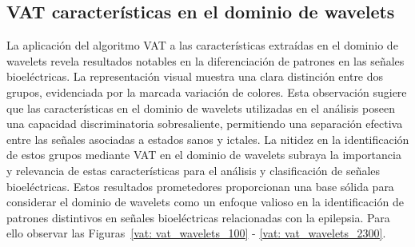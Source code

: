 \subsection{VAT características en el dominio de wavelets}
La aplicación del algoritmo VAT a las características extraídas en el dominio de wavelets revela resultados notables en la diferenciación de patrones en las señales bioeléctricas. La representación visual muestra una clara distinción entre dos grupos, evidenciada por la marcada variación de colores. Esta observación sugiere que las características en el dominio de wavelets utilizadas en el análisis poseen una capacidad discriminatoria sobresaliente, permitiendo una separación efectiva entre las señales asociadas a estados sanos y ictales. La nitidez en la identificación de estos grupos mediante VAT en el dominio de wavelets subraya la importancia y relevancia de estas características para el análisis y clasificación de señales bioeléctricas. Estos resultados prometedores proporcionan una base sólida para considerar el dominio de wavelets como un enfoque valioso en la identificación de patrones distintivos en señales bioeléctricas relacionadas con la epilepsia. Para ello observar las Figuras~\ref{vat: vat_wavelets_100} - \ref{vat: vat_wavelets_2300}.


